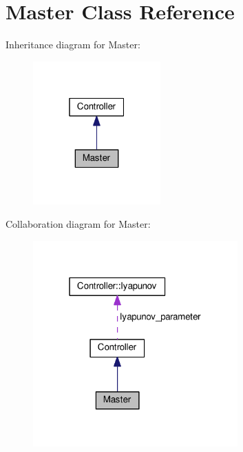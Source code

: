 \hypertarget{classMaster}{}\section{Master Class Reference}
\label{classMaster}


Inheritance diagram for Master\+:\nopagebreak
\begin{figure}[H]
\begin{center}
\leavevmode
\includegraphics[width=139pt]{classMaster__inherit__graph}
\end{center}
\end{figure}


Collaboration diagram for Master\+:\nopagebreak
\begin{figure}[H]
\begin{center}
\leavevmode
\includegraphics[width=223pt]{classMaster__coll__graph}
\end{center}
\end{figure}
